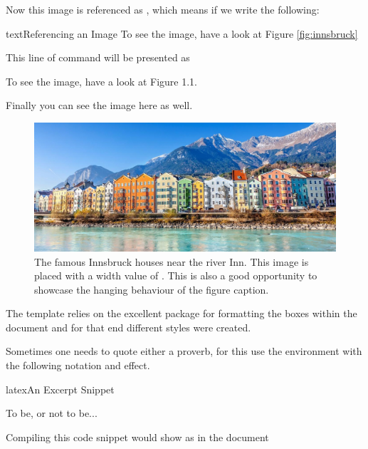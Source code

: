 \documentclass[minted, draw, cover = contour]{../tex/hebdomon}
\begin{document}
% 
\begin{hgitemize}
	\item[] Now this image is referenced as , which
	means if we write the following:
\end{hgitemize}
%
\begin{Code}{text}{Referencing an Image}
	To see the image, have a look at Figure \ref{fig:innsbruck}
\end{Code}
%
This line of command will be presented as
%
\begin{excerpt}
	To see the image, have a look at Figure 1.1.
\end{excerpt}
%
Finally you can see the image here as well.
%
\begin{figure}[ht]
	\centering
	\includegraphics[width=\linewidth]{figures/innsbruck.jpg}
	\caption{The famous Innsbruck houses near the river Inn. This image is
		placed with a width value of . This is also
		a good opportunity to showcase the hanging behaviour of the figure
		caption.}
\end{figure}
%
%
\begin{hgitemize}
	\item[\pcode{Excerpt}] The template relies on the excellent  package for
	formatting the boxes within the document and for that end different styles were created.
	\item[] Sometimes one needs to quote either a proverb, for this use
	the  environment with the following notation and effect.
\end{hgitemize}
%
\begin{Code}{latex}{An Excerpt Snippet}
	\begin{Excerpt}
		To be, or not to be...
	\end{Excerpt}
\end{Code}
%
\begin{hgitemize}
	\item[] Compiling this code snippet would show as in the document
\end{hgitemize}
\end{document}
